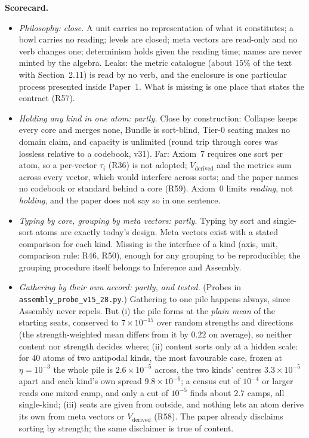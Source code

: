 \documentclass[11pt]{article}
\begin{document}
\textbf{Scorecard.}
\begin{itemize}
\item \emph{Philosophy: close.} A unit carries no representation of what it
constitutes; a bowl carries no reading; levels are closed; meta vectors are
read-only and no verb changes one; determinism holds given the reading time;
names are never minted by the algebra. Leaks: the metric catalogue (about
$15\%$ of the text with Section~2.11) is read by no verb, and the enclosure is
one particular process presented inside Paper~1. What is missing is one place
that states the contract (R57).
\item \emph{Holding any kind in one atom: partly.} Close by construction:
Collapse keeps every core and merges none, Bundle is sort-blind, Tier-0 seating
makes no domain claim, and capacity is unlimited (round trip through cores was
lossless relative to a codebook, v31). Far: Axiom~7 requires one sort per atom,
so a per-vector $\tau_i$ (R36) is not adopted; $V_{\text{derived}}$ and the
metrics sum across every vector, which would interfere across sorts; and the
paper names no codebook or standard behind a core (R59). Axiom~0 limits
\emph{reading}, not \emph{holding}, and the paper does not say so in one
sentence.
\item \emph{Typing by core, grouping by meta vectors: partly.} Typing by sort
and single-sort atoms are exactly today's design. Meta vectors exist with a
stated comparison for each kind. Missing is the interface of a kind (axis, unit,
comparison rule: R46, R50), enough for any grouping to be reproducible; the
grouping procedure itself belongs to Inference and Assembly.
\item \emph{Gathering by their own accord: partly, and tested.} (Probes in
\texttt{assembly\_probe\_v15\_28.py}.) Gathering to one pile happens always,
since Assembly never repels. But (i) the pile forms at the \emph{plain mean} of
the starting seats, conserved to $7\times10^{-15}$ over random strengths and
directions (the strength-weighted mean differs from it by $0.22$ on average), so
neither content nor strength decides where; (ii) content sorts only at a
hidden scale: for $40$ atoms of two antipodal kinds, the most favourable case,
frozen at $\eta=10^{-3}$ the whole pile is $2.6\times10^{-5}$ across, the two
kinds' centres $3.3\times10^{-5}$ apart and each kind's own spread
$9.8\times10^{-6}$; a census cut of $10^{-4}$ or larger reads one mixed camp,
and only a cut of $10^{-5}$ finds about $2.7$ camps, all single-kind; (iii) seats
are given from outside, and nothing lets an atom derive its own from meta
vectors or $V_{\text{derived}}$ (R58). The paper already disclaims sorting by
strength; the same disclaimer is true of content.
\end{itemize}
\end{document}
